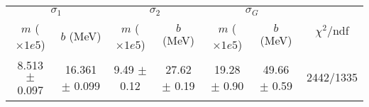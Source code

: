\begin{tabular}{cc|cc|cc||c}
\multicolumn{2}{c|}{$\sigma_1$} & \multicolumn{2}{|c}{$\sigma_2$} & \multicolumn{2}{|c}{$\sigma_G$}  & \multirow{2}{*}{$\chi^2/$ndf}\\
$m$ ($\times1e5$) & $b$ (MeV) & $m$ ($\times1e5$) & $b$ (MeV) & $m$ ($\times1e5$) & $b$ (MeV) & \\
\hline
8.513 $\pm$ 0.097 & 16.361 $\pm$ 0.099 & 9.49 $\pm$ 0.12 & 27.62 $\pm$ 0.19 & 19.28 $\pm$ 0.90 & 49.66 $\pm$ 0.59 & 2442/1335\\
\end{tabular}
